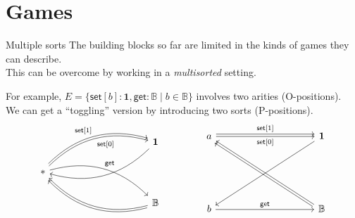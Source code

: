 \documentclass[aspectratio=1610,mathserif]{beamer}
\begin{document}

\section{Games} %
\frame\sectionpage

\begin{frame}[fragile]{Multiple sorts}
  The building blocks so far are limited in the kinds of games they can describe. \\
  This can be overcome by working in a \emph{multisorted} setting.

  \vfill
  For example,
  $E = \{ \mathsf{set}[b] : \mathbf{1}, \mathsf{get} : \mathbb{B} \mid
          b \in \mathbb{B} \}$
  involves two arities (O-positions). \\
  We can get a ``toggling'' version by introducing two sorts (P-positions).
  \[
    \begin{tikzcd}[column sep=10em]
      & \mathbf{1} \ar[dl, bend left] \\
      {*} \ar[ur, bend left, "{\mathsf{set}[0]}"']
          \ar[ur, bend left, shift left, "{\mathsf{set}[1]}"]
          \ar[dr, bend left, "{\mathsf{get}}"] \\
      & \mathbb{B} \ar[ul, bend left]
                   \ar[ul, bend left, shift left]
    \end{tikzcd}
    \qquad \qquad
    \begin{tikzcd}[column sep=10em, row sep=6em]
      {a} \ar[r, "{\mathsf{set}[0]}"']
          \ar[r, shift left, "{\mathsf{set}[1]}"] &
      \mathbf{1} \ar[ld] \\
      {b} \ar[r, "{\mathsf{get}}"] &
      \mathbb{B} \ar[ul]
                 \ar[ul, shift left]
    \end{tikzcd}
  \]
\end{frame}
\end{document}
